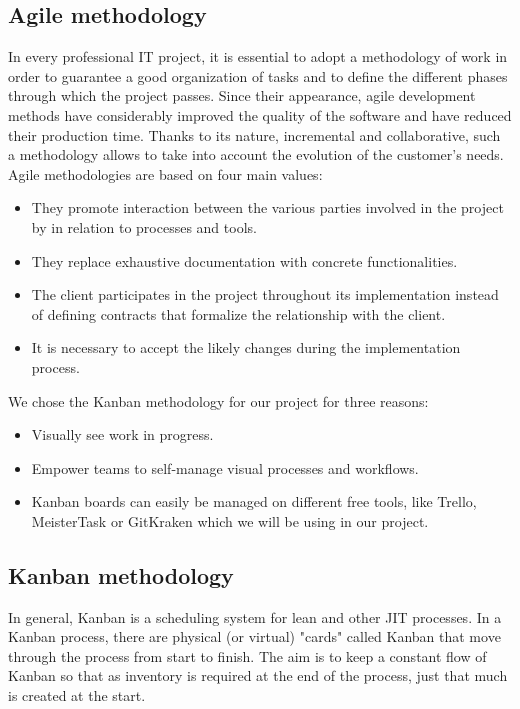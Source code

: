 \begin{spacing}{1.2}
\subsection{Agile methodology}
In every professional IT project, it is essential to adopt a methodology
of work in order to guarantee a good organization of tasks and to define the different phases
through which the project passes.
Since their appearance, agile development methods have considerably improved
the quality of the software and have reduced their production time. Thanks to its nature,
incremental and collaborative, such a methodology allows to take into account the evolution
of the customer's needs. Agile methodologies are based on four main values:
\begin{itemize}
	\item They promote interaction between the various parties involved in the project by
in relation to processes and tools.
\item They replace exhaustive documentation with concrete functionalities.
\item The client participates in the project throughout its implementation instead of defining contracts
that formalize the relationship with the client.
\item It is necessary to accept the likely changes during the implementation process.
\end{itemize}

We chose the Kanban methodology for our project for three reasons:

\begin{itemize}
	\item Visually see work in progress.
	\item Empower teams to self-manage visual processes and workflows.
	\item Kanban boards can easily be managed on different free tools, like Trello, MeisterTask or GitKraken which we will be using in our project.
\end{itemize}



\subsection{Kanban methodology}

In general, Kanban is a scheduling system for lean and other JIT processes. In a Kanban process, there are physical (or virtual) "cards" called Kanban that move through the process from start to finish. The aim is to keep a constant flow of Kanban so that as inventory is required at the end of the process, just that much is created at the start.



\end{spacing}

